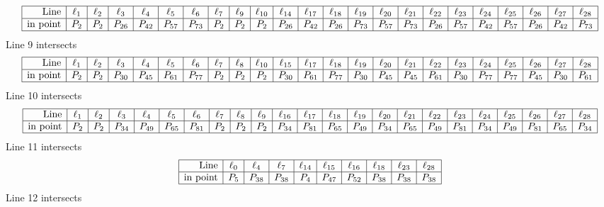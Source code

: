 \documentclass{article}
\begin{document}
{$$\begin{array}{|r*{22}{|c}|}
\hline
\mbox{Line}  & \ell_{1} & \ell_{2} & \ell_{3} & \ell_{4} & \ell_{5} & \ell_{6} & \ell_{7} & \ell_{9} & \ell_{10} & \ell_{14} & \ell_{17} & \ell_{18} & \ell_{19} & \ell_{20} & \ell_{21} & \ell_{22} & \ell_{23} & \ell_{24} & \ell_{25} & \ell_{26} & \ell_{27} & \ell_{28}\\
\hline
\mbox{in point}  & P_{2} & P_{2} & P_{26} & P_{42} & P_{57} & P_{73} & P_{2} & P_{2} & P_{2} & P_{26} & P_{42} & P_{26} & P_{73} & P_{57} & P_{73} & P_{26} & P_{57} & P_{42} & P_{57} & P_{26} & P_{42} & P_{73}\\
\hline
\end{array}
$$
Line 9 intersects 
$$
\begin{array}{|r*{22}{|c}|}
\hline
\mbox{Line}  & \ell_{1} & \ell_{2} & \ell_{3} & \ell_{4} & \ell_{5} & \ell_{6} & \ell_{7} & \ell_{8} & \ell_{10} & \ell_{15} & \ell_{17} & \ell_{18} & \ell_{19} & \ell_{20} & \ell_{21} & \ell_{22} & \ell_{23} & \ell_{24} & \ell_{25} & \ell_{26} & \ell_{27} & \ell_{28}\\
\hline
\mbox{in point}  & P_{2} & P_{2} & P_{30} & P_{45} & P_{61} & P_{77} & P_{2} & P_{2} & P_{2} & P_{30} & P_{61} & P_{77} & P_{30} & P_{45} & P_{45} & P_{61} & P_{30} & P_{77} & P_{77} & P_{45} & P_{30} & P_{61}\\
\hline
\end{array}
$$
Line 10 intersects 
$$
\begin{array}{|r*{22}{|c}|}
\hline
\mbox{Line}  & \ell_{1} & \ell_{2} & \ell_{3} & \ell_{4} & \ell_{5} & \ell_{6} & \ell_{7} & \ell_{8} & \ell_{9} & \ell_{16} & \ell_{17} & \ell_{18} & \ell_{19} & \ell_{20} & \ell_{21} & \ell_{22} & \ell_{23} & \ell_{24} & \ell_{25} & \ell_{26} & \ell_{27} & \ell_{28}\\
\hline
\mbox{in point}  & P_{2} & P_{2} & P_{34} & P_{49} & P_{65} & P_{81} & P_{2} & P_{2} & P_{2} & P_{34} & P_{81} & P_{65} & P_{49} & P_{34} & P_{65} & P_{49} & P_{81} & P_{34} & P_{49} & P_{81} & P_{65} & P_{34}\\
\hline
\end{array}
$$
Line 11 intersects 
$$
\begin{array}{|r*{9}{|c}|}
\hline
\mbox{Line}  & \ell_{0} & \ell_{4} & \ell_{7} & \ell_{14} & \ell_{15} & \ell_{16} & \ell_{18} & \ell_{23} & \ell_{28}\\
\hline
\mbox{in point}  & P_{5} & P_{38} & P_{38} & P_{4} & P_{47} & P_{52} & P_{38} & P_{38} & P_{38}\\
\hline
\end{array}
$$
Line 12 intersects 
$$
\begin{array}{|r*{9}{|c}|}

\end{array}$$}
\end{document}

